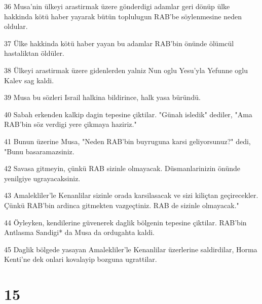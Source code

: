 \par 36 Musa'nin ülkeyi arastirmak üzere gönderdigi adamlar geri dönüp ülke hakkinda kötü haber yayarak bütün toplulugun RAB'be söylenmesine neden oldular.
\par 37 Ülke hakkinda kötü haber yayan bu adamlar RAB'bin önünde ölümcül hastaliktan öldüler.
\par 38 Ülkeyi arastirmak üzere gidenlerden yalniz Nun oglu Yesu'yla Yefunne oglu Kalev sag kaldi.
\par 39 Musa bu sözleri Israil halkina bildirince, halk yasa büründü.
\par 40 Sabah erkenden kalkip dagin tepesine çiktilar. "Günah isledik" dediler, "Ama RAB'bin söz verdigi yere çikmaya haziriz."
\par 41 Bunun üzerine Musa, "Neden RAB'bin buyruguna karsi geliyorsunuz?" dedi, "Bunu basaramazsiniz.
\par 42 Savasa gitmeyin, çünkü RAB sizinle olmayacak. Düsmanlarinizin önünde yenilgiye ugrayacaksiniz.
\par 43 Amalekliler'le Kenanlilar sizinle orada karsilasacak ve sizi kiliçtan geçirecekler. Çünkü RAB'bin ardinca gitmekten vazgeçtiniz. RAB de sizinle olmayacak."
\par 44 Öyleyken, kendilerine güvenerek daglik bölgenin tepesine çiktilar. RAB'bin Antlasma Sandigi* da Musa da ordugahta kaldi.
\par 45 Daglik bölgede yasayan Amalekliler'le Kenanlilar üzerlerine saldirdilar, Horma Kenti'ne dek onlari kovalayip bozguna ugrattilar.

\chapter{15}


